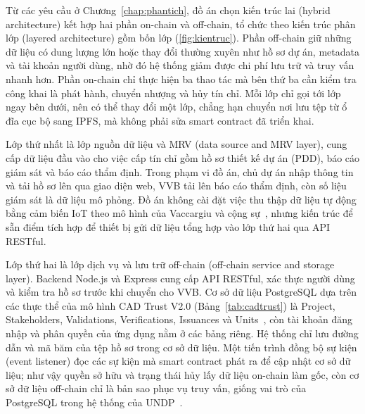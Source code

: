 Từ các yêu cầu ở Chương~\ref{chap:phantich}, đồ án chọn kiến trúc lai (hybrid architecture) kết hợp hai phần on-chain và off-chain, tổ chức theo kiến trúc phân lớp (layered architecture) gồm bốn lớp (\autoref{fig:kientruc}). Phần off-chain giữ những dữ liệu có dung lượng lớn hoặc thay đổi thường xuyên như hồ sơ dự án, metadata và tài khoản người dùng, nhờ đó hệ thống giảm được chi phí lưu trữ và truy vấn nhanh hơn. Phần on-chain chỉ thực hiện ba thao tác mà bên thứ ba cần kiểm tra công khai là phát hành, chuyển nhượng và hủy tín chỉ. Mỗi lớp chỉ gọi tới lớp ngay bên dưới, nên có thể thay đổi một lớp, chẳng hạn chuyển nơi lưu tệp từ ổ đĩa cục bộ sang IPFS, mà không phải sửa smart contract đã triển khai.

Lớp thứ nhất là lớp nguồn dữ liệu và MRV (data source and MRV layer), cung cấp dữ liệu đầu vào cho việc cấp tín chỉ gồm hồ sơ thiết kế dự án (PDD), báo cáo giám sát và báo cáo thẩm định. Trong phạm vi đồ án, chủ dự án nhập thông tin và tải hồ sơ lên qua giao diện web, VVB tải lên báo cáo thẩm định, còn số liệu giám sát là dữ liệu mô phỏng. Đồ án không cài đặt việc thu thập dữ liệu tự động bằng cảm biến IoT theo mô hình của Vaccargiu và cộng sự~\cite{vaccargiu2026blockchain}, nhưng kiến trúc để sẵn điểm tích hợp để thiết bị gửi dữ liệu tổng hợp vào lớp thứ hai qua API RESTful.

Lớp thứ hai là lớp dịch vụ và lưu trữ off-chain (off-chain service and storage layer). Backend Node.js và Express cung cấp API RESTful, xác thực người dùng và kiểm tra hồ sơ trước khi chuyển cho VVB. Cơ sở dữ liệu PostgreSQL dựa trên các thực thể của mô hình CAD Trust V2.0 (Bảng~\ref{tab:cadtrust}) là Project, Stakeholders, Validations, Verifications, Issuances và Units~\cite{cadtrust2025datamodel}, còn tài khoản đăng nhập và phân quyền của ứng dụng nằm ở các bảng riêng. Hệ thống chỉ lưu đường dẫn và mã băm của tệp hồ sơ trong cơ sở dữ liệu. Một tiến trình đồng bộ sự kiện (event listener) đọc các sự kiện mà smart contract phát ra để cập nhật cơ sở dữ liệu; như vậy quyền sở hữu và trạng thái hủy lấy dữ liệu on-chain làm gốc, còn cơ sở dữ liệu off-chain chỉ là bản sao phục vụ truy vấn, giống vai trò của PostgreSQL trong hệ thống của UNDP~\cite{undp2024nationalregistry}.

